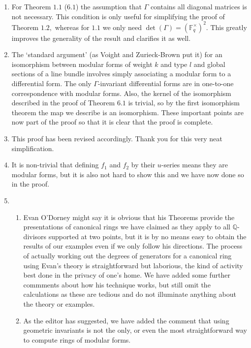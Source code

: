 \documentclass[12pt]{article}
\begin{document}
	\begin{enumerate}
		\item For Theorem $1.1$ ($6.1$) the assumption that $\Gamma$ contains all diagonal matrices is not necessary. This condition is only useful for simplifying the proof of Theorem $1.2,$ whereas for $1.1$ we only need $\operatorname{det}(\Gamma)=(\mathbb{F}_q^{\times})^2.$ This greatly improves the generality of the result and clarifies it as well. 
		
		\item The `standard argument' (as Voight and Zurieck-Brown put it) for an isomorphism between modular forms of weight $k$ and type $l$ and global sections of a line bundle involves simply associating a modular form to a differential form. The only $\Gamma$-invariant differential forms are in one-to-one correspondence with modular forms. Also, the kernel of the isomorphism described in the proof of Theorem $6.1$ is trivial, so by the first isomorphism theorem the map we describe is an isomorphism. These important points are now part of the proof so that it is clear that the proof is complete. 
		 
		\item This proof has been revised accordingly. Thank you for this very neat simplification. 
		
		\item It is non-trivial that defining $f_1$ and $f_2$ by their $u$-series means they are modular forms, but it is also not hard to show this and we have now done so in the proof. 
		
		\item 
		\begin{enumerate}
			\item Evan O'Dorney might say it is obvious that his Theorems provide the presentations of canonical rings we have claimed as they apply to all $\mathbb{Q}$-divisors supported at two points, but it is by no means easy to obtain the results of our examples even if we only follow his directions. The process of actually working out the degrees of generators for a canonical ring using Evan's theory is straightforward but laborious, the kind of activity best done in the privacy of one's home. We have added some further commments about how his technique works, but still omit the calculations as these are tedious and do not illuminate anything about the theory or examples. 
			
			\item As the editor has suggested, we have added the comment that using geometric invariants is not the only, or even the most straightforward way to compute rings of modular forms. 
		\end{enumerate}
		

\end{enumerate}
\end{document}
